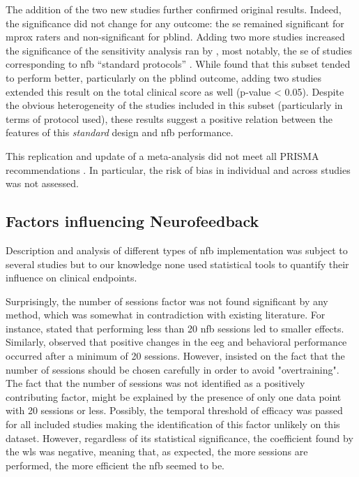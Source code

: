 The addition of the two new studies \citep{Strehl2017, Baumeister2016} further confirmed original results. Indeed, the
significance did not change for any outcome: the \gls{se} remained significant for \gls{mprox} raters and
non-significant for \gls{pblind}. Adding two more studies increased the significance of the sensitivity analysis ran by
\citeauthor{Cortese2016}, most notably, the \gls{se} of studies corresponding to \gls{nfb} "`standard protocols"' \citep{Arns2014}. 
While \citeauthor{Cortese2016} found that this subset tended to perform better, particularly on the \gls{pblind} outcome, 
adding two studies extended this result on the total clinical score as well (p-value < 0.05). Despite the obvious heterogeneity 
of the studies included in this subset (particularly in terms of protocol used), these results suggest a positive relation 
between the features of this \emph{standard} design and \gls{nfb} performance.

This replication and update of a meta-analysis did not meet all PRISMA recommendations \citep{Moher2009}. In particular, the risk of bias
in individual and across studies was not assessed.  

\subsection{Factors influencing Neurofeedback}

Description and analysis of different types of \gls{nfb} implementation was subject to several studies \citep{Arns2014, 
Enriquez2017, Vernon2004, Jeunet2018} but to our knowledge none used statistical tools to quantify their influence on
clinical endpoints. 

Surprisingly, the number of sessions factor was not found significant by any method, which was somewhat
in contradiction with existing literature. For instance, \citet{Arns2014} stated that performing less than
20 \gls{nfb} sessions led to smaller effects. Similarly, \citet{Vernon2004} observed that positive changes in the \gls{eeg}
and behavioral performance occurred after a minimum of 20 sessions. However, \citet{Enriquez2017} insisted on the fact that the number of
sessions should be chosen carefully in order to avoid "overtraining". The fact that the number of sessions was not identified as a 
positively contributing factor, might be explained by the presence of only one data point with 20 sessions or less. Possibly, 
the temporal threshold of efficacy was passed for all included studies making the identification of this factor unlikely on 
this dataset. However, regardless of its statistical significance, the coefficient found by the \gls{wls} was negative, meaning 
that, as expected, the more sessions are performed, the more efficient the \gls{nfb} seemed to be. 

